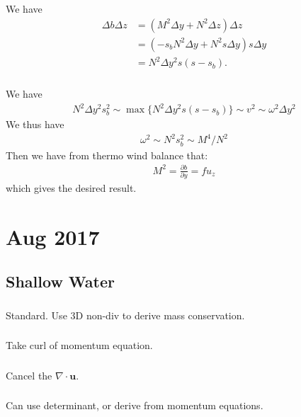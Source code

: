 \documentclass[11pt,letterpaper]{book}
\theoremstyle{definition}
\newcommand{\pe}{\partial}
\newcommand{\ve}[1]{\boldsymbol{#1}}
\begin{document}
\subsection{}
We have
\begin{align*}
    \Delta b\Delta z &= (M^2\Delta y+N^2\Delta z)\Delta z\\
    &= (-s_bN^2\Delta y+N^2s\Delta y)s\Delta y\\
    &= N^2\Delta y^2 s(s-s_b).
\end{align*}

\subsection{}
We have
\begin{align*}
    N^2\Delta y^2s_b^2 \sim \max \{N^2\Delta y^2 s(s-s_b)\}\sim v^2 \sim \omega^2 \Delta y^2
\end{align*}
We thus have
\begin{align*}
    \omega^2\sim N^2s_b^2 \sim M^4/N^2
\end{align*}
Then we have from thermo wind balance that:
\begin{align*}
    M^2 = \frac{\pe b}{\pe y} = fu_z
\end{align*}
which gives the desired result.

\chapter{Aug 2017}
\section{Shallow Water}
\subsection{}
Standard. Use 3D non-div to derive mass conservation.

\subsection{}
Take curl of momentum equation.

\subsection{}
Cancel the $\nabla\cdot\ve u$.

\subsection{}
Can use determinant, or derive from momentum equations.
\end{document}
